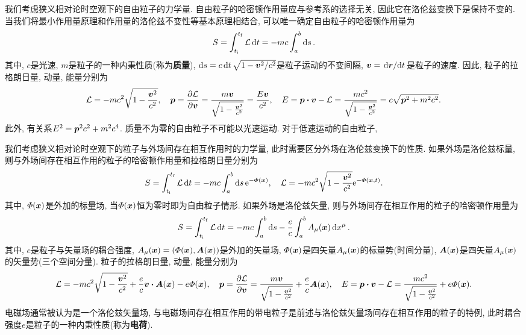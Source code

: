 我们考虑狭义相对论时空观下的自由粒子的力学量. 自由粒子的哈密顿作用量应与参考系的选择无关, 因此它在洛伦兹变换下是保持不变的. 当我们将最小作用量原理和作用量的洛伦兹不变性等基本原理相结合, 可以唯一确定自由粒子的哈密顿作用量为
\begin{equation*}
    S = \int_{t_{\mathrm{i}}}^{t_{\mathrm{f}}} \mathcal{L} \dd{t} = -mc \int_a^b \dd{s}.
\end{equation*}
其中, $ c $是光速, $ m $是粒子的一种内秉性质(称为\textbf{质量}), $ \dd{s} = c\dd{t} \sqrt{1-\vb*{v}^2/c^2} $是粒子运动的不变间隔, $ \vb*{v} = \dv*{\vb*{r}}{t} $是粒子的速度. 因此, 粒子的拉格朗日量, 动量, 能量分别为
\begin{equation*}
    \lagr = -mc^2 \sqrt{1-\frac{\vb*{v}^2}{c^2}}, \quad \vb*{p} = \pdv{\lagr}{\vb*{v}} = \frac{m\vb*{v}}{\sqrt{1-\frac{\vb*{v}^2}{c^2}}} = \frac{E \vb*{v}}{c^2}, \quad E = \vb*{p} \vdot \vb*{v} - \lagr = \frac{mc^2}{\sqrt{1-\frac{\vb*{v}^2}{c^2}}} = c \sqrt{\vb*{p}^2 + m^2 c^2}.
\end{equation*}
此外, 有关系$ E^2 = \vb*{p}^2 c^2 + m^2 c^4 $. 质量不为零的自由粒子不可能以光速运动. 对于低速运动的自由粒子, 

我们考虑狭义相对论时空观下的粒子与外场间存在相互作用时的力学量, 此时需要区分外场在洛伦兹变换下的性质. 如果外场是洛伦兹标量, 则与外场间存在相互作用的粒子的哈密顿作用量和拉格朗日量分别为
\begin{equation*}
    S = \int_{t_{\mathrm{i}}}^{t_{\mathrm{f}}} \mathcal{L} \dd{t} = -mc \int_a^b \dd{s} \mathrm{e}^{-\varPhi(\vb*{x})}, \quad \mathcal{L} = -mc^2 \sqrt{1-\frac{\vb*{v}^2}{c^2}} \mathrm{e}^{-\varPhi(\vb*{x},t)}.
\end{equation*}
其中, $ \varPhi(\vb*{x}) $是外加的标量场, 当$ \varPhi(\vb*{x}) $恒为零时即为自由粒子情形. 如果外场是洛伦兹矢量, 则与外场间存在相互作用的粒子的哈密顿作用量为
\begin{equation*}
    S = \int_{t_{\mathrm{i}}}^{t_{\mathrm{f}}} \mathcal{L} \dd{t} = -mc \int_a^b \dd{s} - \frac{e}{c} \int_a^b A_{\mu} (\vb*{x}) \dd{x^{\mu}}.
\end{equation*}
其中, $ e $是粒子与矢量场的耦合强度, $ A_{\mu} (\vb*{x})=(\varPhi(\vb*{x}),\vb*{A}(\vb*{x})) $是外加的矢量场, $ \varPhi(\vb*{x}) $是四矢量$ A_{\mu} (\vb*{x}) $的标量势(时间分量), $ \vb*{A}(\vb*{x}) $是四矢量$ A_{\mu} (\vb*{x}) $的矢量势(三个空间分量). 粒子的拉格朗日量, 动量, 能量分别为
\begin{equation*}
    \lagr = -mc^2 \sqrt{1-\frac{\vb*{v}^2}{c^2}} + \frac{e}{c} \vb*{v} \vdot \vb*{A}(\vb*{x}) - e \varPhi(\vb*{x}), \quad \vb*{p} = \pdv{\lagr}{\vb*{v}} = \frac{m\vb*{v}}{\sqrt{1-\frac{\vb*{v}^2}{c^2}}} + \frac{e}{c} \vb*{A}(\vb*{x}), \quad E = \vb*{p} \vdot \vb*{v} - \lagr = \frac{mc^2}{\sqrt{1-\frac{\vb*{v}^2}{c^2}}} + e \varPhi(\vb*{x}).
\end{equation*}
电磁场通常被认为是一个洛伦兹矢量场, 与电磁场间存在相互作用的带电粒子是前述与洛伦兹矢量场间存在相互作用的粒子的特例, 此时耦合强度$ e $是粒子的一种内秉性质(称为\textbf{电荷}).
\newpage
